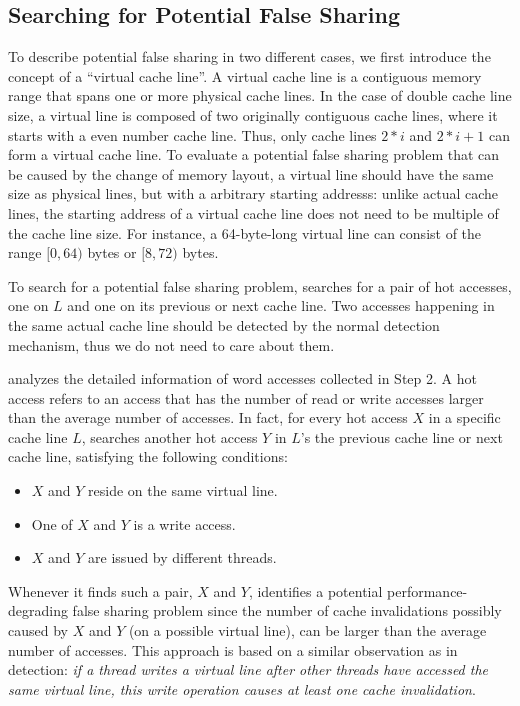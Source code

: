 \subsection{Searching for Potential False Sharing}
\label{sec:evaluatingfs}
To describe potential false sharing in two different cases, we first 
introduce the concept of a ``virtual cache line''.  A virtual cache line is a contiguous memory range that spans one or more physical cache lines.  In the case of double cache line size, a virtual line is composed of two originally contiguous cache lines, where it starts with a even number cache line.  Thus, only cache lines $2*i$ and $2*i+1$ can form a virtual cache line.  To evaluate a potential false sharing problem that can be caused by the change of memory layout, a virtual line should have the same size as physical lines, but with a  arbitrary starting addresss: unlike actual cache lines, the
starting address of a virtual cache line does not need to be multiple of the cache line size.  For instance, a 64-byte-long virtual line can consist of the range $[0,64)$ bytes or $[8,72)$ bytes.

To search for a potential false sharing problem, 
\Predator{} searches for a pair of hot accesses, one on $L$ and one on its previous or next cache line. Two accesses happening in the same actual cache line should be detected by the normal detection mechanism, thus we do not need to care about them. 

\predator{} analyzes the detailed information of word accesses collected in Step 2. A hot access refers to an access that has the number of read or write accesses larger than the average number of accesses. In fact, for every hot access $X$ in a specific cache line $L$, \Predator{} searches another
hot access $Y$ in $L$'s the previous cache line or next cache line, satisfying the following conditions: 

\begin{itemize}
\item
$X$ and $Y$ reside on the same virtual line. 

\item
One of $X$ and $Y$ is a write access.

\item 
$X$ and $Y$ are issued by different threads.

\end{itemize}

Whenever it finds such a pair, $X$ and $Y$, 
\Predator{} identifies a potential performance-degrading false sharing problem since the number of cache invalidations possibly caused by $X$ and $Y$ (on a possible virtual line), 
can be larger than the average number of accesses. 
This approach is based on a similar observation as in detection: \emph{if a thread writes a virtual line after other threads have accessed the same virtual line, this write operation causes at least one cache invalidation}. 

